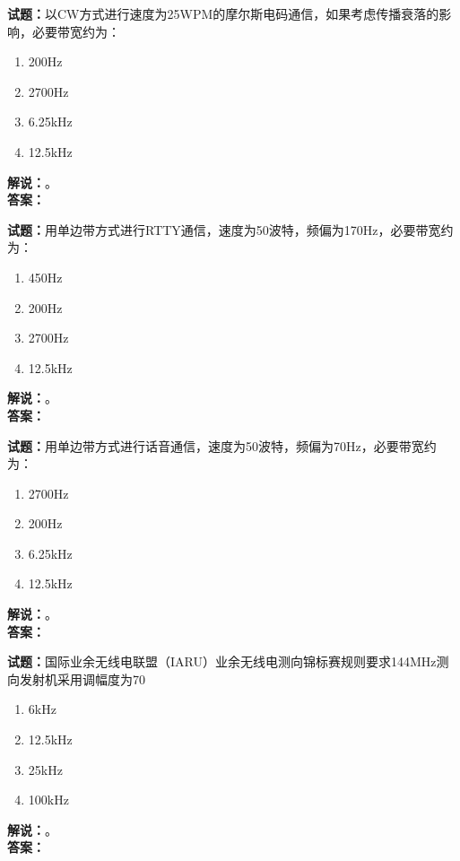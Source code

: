 \documentclass{ctexbook}
\begin{document}
\bigskip

\noindent\textbf{试题：}以CW方式进行速度为25WPM的摩尔斯电码通信，如果考虑传播衰落的影响，必要带宽约为：
\begin{enumerate}[leftmargin=3em]
  \item 200Hz
  \item 2700Hz
  \item 6.25\unit{\kHz}
  \item 12.5\unit{\kHz}
\end{enumerate}
\noindent\textbf{解说：}\textbf{}。\\\noindent\textbf{答案：}

\bigskip

\noindent\textbf{试题：}用单边带方式进行RTTY通信，速度为50波特，频偏为170Hz，必要带宽约为：
\begin{enumerate}[leftmargin=3em]
  \item 450Hz
  \item 200Hz
  \item 2700Hz
  \item 12.5\unit{\kHz}
\end{enumerate}
\noindent\textbf{解说：}\textbf{}。\\\noindent\textbf{答案：}

\bigskip

\noindent\textbf{试题：}用单边带方式进行话音通信，速度为50波特，频偏为70Hz，必要带宽约为：
\begin{enumerate}[leftmargin=3em]
  \item 2700Hz
  \item 200Hz
  \item 6.25\unit{\kHz}
  \item 12.5\unit{\kHz}
\end{enumerate}
\noindent\textbf{解说：}\textbf{}。\\\noindent\textbf{答案：}

\bigskip

\noindent\textbf{试题：}国际业余无线电联盟（IARU）业余无线电测向锦标赛规则要求144\unit{\MHz}测向发射机采用调幅度为70%
\begin{enumerate}[leftmargin=3em]
  \item 6\unit{\kHz}
  \item 12.5\unit{\kHz}
  \item 25\unit{\kHz}
  \item 100\unit{\kHz}
\end{enumerate}
\noindent\textbf{解说：}\textbf{}。\\\noindent\textbf{答案：}
\end{document}
